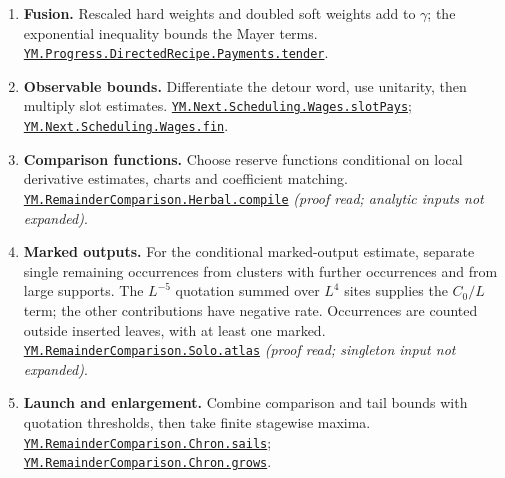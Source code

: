 \documentclass[
  letterpaper,
  11pt]{article}
\providecommand{\tightlist}{%
  \setlength{\itemsep}{0pt}\setlength{\parskip}{0pt}}
\begin{document}
\begin{enumerate}
\def\labelenumi{\arabic{enumi}.}
\tightlist
\item
  \textbf{Fusion.} Rescaled hard weights and doubled soft weights add to
  \(\gamma\); the exponential inequality bounds the Mayer terms.
  \href{https://github.com/yang-mills-group/OpenAI-YM-20261028/blob/3456e5e75cf8d4cd558955a5c7638fba2d68f464/YM/Progress/DIRECTED_RECIPE/Tender.lean\#L124-L133}{\texttt{YM.Progress.DirectedRecipe.Payments.tender}}.
\item
  \textbf{Observable bounds.} Differentiate the detour word, use
  unitarity, then multiply slot estimates.
  \href{https://github.com/yang-mills-group/OpenAI-YM-20261028/blob/3456e5e75cf8d4cd558955a5c7638fba2d68f464/YM/Next/SCHEDULE/SlotPay.lean\#L108-L159}{\texttt{YM.Next.Scheduling.Wages.slotPays}};
  \href{https://github.com/yang-mills-group/OpenAI-YM-20261028/blob/3456e5e75cf8d4cd558955a5c7638fba2d68f464/YM/Next/SCHEDULE/TensorCost.lean\#L56-L71}{\texttt{YM.Next.Scheduling.Wages.fin}}.
\item
  \textbf{Comparison functions.} Choose reserve functions conditional on
  local derivative estimates, charts and coefficient matching.
  \href{https://github.com/yang-mills-group/OpenAI-YM-20261028/blob/3456e5e75cf8d4cd558955a5c7638fba2d68f464/YM/RemainderComparison/Herbal/Orbit.lean\#L41-L56}{\texttt{YM.RemainderComparison.Herbal.compile}}
  \emph{(proof read; analytic inputs not expanded)}.
\item
  \textbf{Marked outputs.} For the conditional marked-output estimate,
  separate single remaining occurrences from clusters with further
  occurrences and from large supports. The \(L^{-5}\) quotation summed
  over \(L^4\) sites supplies the \(C_0/L\) term; the other
  contributions have negative rate. Occurrences are counted outside
  inserted leaves, with at least one marked.
  \href{https://github.com/yang-mills-group/OpenAI-YM-20261028/blob/3456e5e75cf8d4cd558955a5c7638fba2d68f464/YM/RemainderComparison/Solo/Barque.lean\#L21-L61}{\texttt{YM.RemainderComparison.Solo.atlas}}
  \emph{(proof read; singleton input not expanded)}.
\item
  \textbf{Launch and enlargement.} Combine comparison and tail bounds
  with quotation thresholds, then take finite stagewise maxima.
  \href{https://github.com/yang-mills-group/OpenAI-YM-20261028/blob/3456e5e75cf8d4cd558955a5c7638fba2d68f464/YM/RemainderComparison/Chron/Age.lean\#L98-L111}{\texttt{YM.RemainderComparison.Chron.sails}};
  \href{https://github.com/yang-mills-group/OpenAI-YM-20261028/blob/3456e5e75cf8d4cd558955a5c7638fba2d68f464/YM/RemainderComparison/Chron/Corners.lean\#L33-L70}{\texttt{YM.RemainderComparison.Chron.grows}}.
\end{enumerate}
\end{document}
